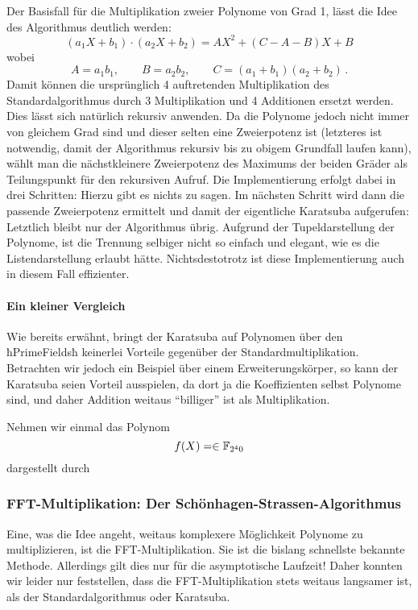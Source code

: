 Der Basisfall für die Multiplikation zweier Polynome von Grad 1, lässt die Idee
des Algorithmus deutlich werden:
\[ (a_1 X + b_1) \cdot (a_2 X + b_2) = 
  A X^2 + (C - A - B) X + B\]
wobei 
\[ A = a_1 b_1, \qquad B = a_2b_2, \qquad C = (a_1+b_1)(a_2+b_2) \,.\]
Damit können die ursprünglich 4 auftretenden Multiplikation des
Standardalgorithmus durch 3 Multiplikation und 4 Additionen ersetzt werden.
Dies lässt sich natürlich rekursiv anwenden. Da die Polynome jedoch nicht immer
von gleichem Grad sind und dieser selten eine Zweierpotenz ist (letzteres ist
notwendig, damit der Algorithmus rekursiv bis zu obigem Grundfall laufen kann),
wählt man die nächstkleinere Zweierpotenz des Maximums der beiden Gräder als
Teilungspunkt für den rekursiven Aufruf.
Die Implementierung erfolgt dabei in drei Schritten: 
Hierzu gibt es nichts zu sagen. Im nächsten Schritt wird dann die passende
Zweierpotenz ermittelt und damit der eigentliche Karatsuba aufgerufen:
Letztlich bleibt nur der Algorithmus übrig. Aufgrund der Tupeldarstellung der
Polynome, ist die Trennung selbiger nicht so einfach und elegant, wie es die
Listendarstellung erlaubt hätte. Nichtsdestotrotz ist diese Implementierung
auch in diesem Fall effizienter.

\paragraph{Ein kleiner Vergleich}
Wie bereits erwähnt, bringt der Karatsuba auf Polynomen über den ħPrimeFieldsħ
keinerlei Vorteile gegenüber der Standardmultiplikation. Betrachten wir jedoch
ein Beispiel über einem Erweiterungskörper, so kann der Karatsuba seien Vorteil
ausspielen, da dort ja die Koeffizienten selbst Polynome sind, und daher
Addition weitaus "`billiger"' ist als Multiplikation.
\begin{beispiel}
  Nehmen wir einmal das Polynom 
  \[ f(X) = \in \mathbb{F}_{2^40}\]
  dargestellt durch
\end{beispiel}

\subsubsection{FFT-Multiplikation: Der Schönhagen-Strassen-Algorithmus}
Eine, was die Idee angeht, weitaus komplexere Möglichkeit Polynome zu
multiplizieren, ist die FFT-Multiplikation. Sie ist die bislang schnellste
bekannte Methode. Allerdings gilt dies nur für die asymptotische Laufzeit!
Daher konnten wir leider nur feststellen, dass die FFT-Multiplikation stets
weitaus langsamer ist, als der Standardalgorithmus oder Karatsuba.

